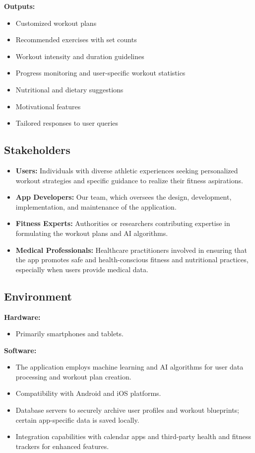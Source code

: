 \documentclass{article}
\begin{document}
    \noindent\textbf{Outputs:}
    \begin{itemize}
        \item Customized workout plans
        \item Recommended exercises with set counts
        \item Workout intensity and duration guidelines
        \item Progress monitoring and user-specific workout statistics
        \item Nutritional and dietary suggestions
        \item Motivational features
        \item Tailored responses to user queries
    \end{itemize}

    \subsection{Stakeholders}

    \begin{itemize}
        \item \textbf{Users:} Individuals with diverse athletic experiences seeking personalized workout strategies and specific guidance to realize their fitness aspirations.
        \item \textbf{App Developers:} Our team, which oversees the design, development, implementation, and maintenance of the application.
        \item \textbf{Fitness Experts:} Authorities or researchers contributing expertise in formulating the workout plans and AI algorithms.
        \item \textbf{Medical Professionals:} Healthcare practitioners involved in ensuring that the app promotes safe and health-conscious fitness and nutritional practices, especially when users provide medical data.
    \end{itemize}

    \subsection{Environment}

    \textbf{Hardware:}
    \begin{itemize}
        \item Primarily smartphones and tablets.
    \end{itemize}

    \noindent \textbf{Software:}
    \begin{itemize}
        \item The application employs machine learning and AI algorithms for user data processing and workout plan creation.
        \item Compatibility with Android and iOS platforms.
        \item Database servers to securely archive user profiles and workout blueprints; certain app-specific data is saved locally.
        \item Integration capabilities with calendar apps and third-party health and fitness trackers for enhanced features.
    \end{itemize}
\end{document}
